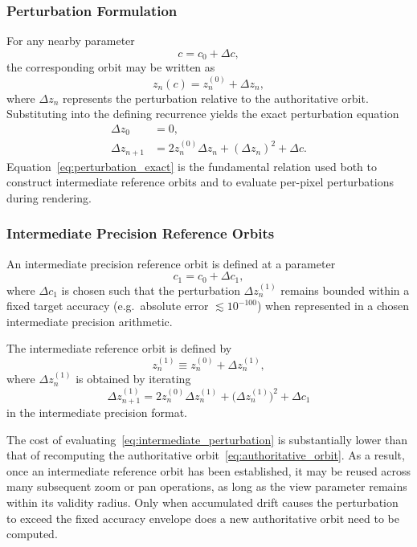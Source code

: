 \subsubsection{Perturbation Formulation}

For any nearby parameter
\[
c = c_0 + \Delta c,
\]
the corresponding orbit may be written as
\[
z_n(c) = z^{(0)}_n + \Delta z_n,
\]
where $\Delta z_n$ represents the perturbation relative to the authoritative orbit.
Substituting into the defining recurrence yields the exact perturbation equation
\begin{align}
\Delta z_0 &= 0, \label{eq:perturbation-init} \\
\Delta z_{n+1}
&= 2 z^{(0)}_n \Delta z_n + (\Delta z_n)^2 + \Delta c.
\label{eq:perturbation_exact}
\end{align}
Equation~\eqref{eq:perturbation_exact} is the fundamental relation used both to construct intermediate reference orbits
and to evaluate per-pixel perturbations during rendering.

\subsubsection{Intermediate Precision Reference Orbits}

An intermediate precision reference orbit is defined at a parameter
\[
c_1 = c_0 + \Delta c_1,
\]
where $\Delta c_1$ is chosen such that the perturbation $\Delta z^{(1)}_n$ remains bounded within a fixed target accuracy
(e.g.\ absolute error $\lesssim 10^{-100}$) when represented in a chosen intermediate precision arithmetic.

The intermediate reference orbit is defined by
\[
z^{(1)}_n \equiv z^{(0)}_n + \Delta z^{(1)}_n,
\]
where $\Delta z^{(1)}_n$ is obtained by iterating
\begin{equation}
\Delta z^{(1)}_{n+1}
= 2 z^{(0)}_n \Delta z^{(1)}_n
  + \bigl(\Delta z^{(1)}_n\bigr)^2
  + \Delta c_1
\label{eq:intermediate_perturbation}
\end{equation}
in the intermediate precision format.

The cost of evaluating~\eqref{eq:intermediate_perturbation} is substantially lower than that of recomputing
the authoritative orbit~\eqref{eq:authoritative_orbit}.
As a result, once an intermediate reference orbit has been established, it may be reused across many subsequent zoom
or pan operations, as long as the view parameter remains within its validity radius.
Only when accumulated drift causes the perturbation to exceed the fixed accuracy envelope does a new authoritative
orbit need to be computed.

